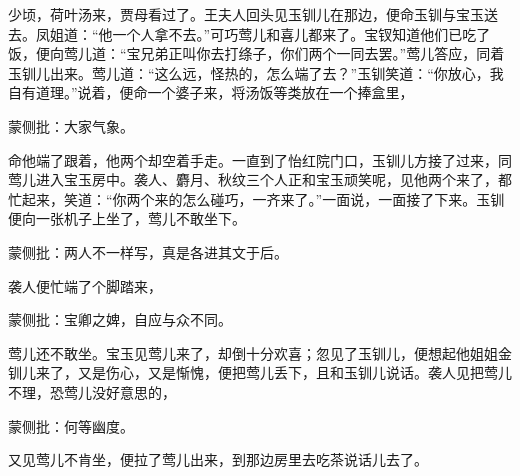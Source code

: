 \begin{parag}
    少顷，荷叶汤来，贾母看过了。王夫人回头见玉钏儿在那边，便命玉钏与宝玉送去。凤姐道：“他一个人拿不去。”可巧莺儿和喜儿都来了。宝钗知道他们已吃了饭，便向莺儿道：“宝兄弟正叫你去打绦子，你们两个一同去罢。”莺儿答应，同着玉钏儿出来。莺儿道：“这么远，怪热的，怎么端了去？”玉钏笑道：“你放心，我自有道理。”说着，便命一个婆子来，将汤饭等类放在一个捧盒里，\begin{note}蒙侧批：大家气象。\end{note}命他端了跟着，他两个却空着手走。一直到了怡红院门口，玉钏儿方接了过来，同莺儿进入宝玉房中。袭人、麝月、秋纹三个人正和宝玉顽笑呢，见他两个来了，都忙起来，笑道：“你两个来的怎么碰巧，一齐来了。”一面说，一面接了下来。玉钏便向一张机子上坐了，莺儿不敢坐下。\begin{note}蒙侧批：两人不一样写，真是各进其文于后。\end{note}袭人便忙端了个脚踏来，\begin{note}蒙侧批：宝卿之婢，自应与众不同。\end{note}莺儿还不敢坐。宝玉见莺儿来了，却倒十分欢喜；忽见了玉钏儿，便想起他姐姐金钏儿来了，又是伤心，又是惭愧，便把莺儿丢下，且和玉钏儿说话。袭人见把莺儿不理，恐莺儿没好意思的，\begin{note}蒙侧批：何等幽度。\end{note}又见莺儿不肯坐，便拉了莺儿出来，到那边房里去吃茶说话儿去了。
\end{parag}


